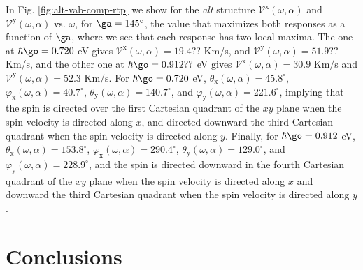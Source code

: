 \documentclass[prb,11pt,tightenlines,twocolumn,aps]{revtex4-1}
\begin{document}

% 


In Fig. \ref{fig:alt-vab-comp-rtp} 
we show  for the {\it alt} structure
$\mathcal{V}^{\mathrm{x}} (\omega,\alpha)$ 
and
$\mathcal{V}^{\mathrm{y}} (\omega,\alpha)$ 
vs. $\omega$, for $\ga=145^\circ$, the value that maximizes both
responses as a function of $\ga$, where we see that each response has
two local maxima. The one at $\hbar\go=0.720$ eV gives
$\mathcal{V}^{\mathrm{x}} (\omega,\alpha) =19.4??$ Km/s,
and $\mathcal{V}^{\mathrm{y}} (\omega,\alpha) = 51.9??$ Km/s, and the
other one at $\hbar\go=0.912??$ eV gives
$\mathcal{V}^{\mathrm{x}} (\omega,\alpha) = 30.9$ Km/s and
$\mathcal{V}^{\mathrm{y}} (\omega,\alpha) = 52.3$ Km/s.
% 
For $\hbar\go=0.720$ eV,
$\theta_{\mathrm{x}} (\omega,\alpha) = 45.8^{\circ}$, $\varphi_{\mathrm{x}}
(\omega,\alpha) = 40.7^{\circ}$, 
$\theta_{\mathrm{y}} (\omega,\alpha) =
140.7^{\circ}$, and $\varphi_{\mathrm{y}} (\omega,\alpha) =
221.6^{\circ}$, implying
% 
that the spin is directed over the first Cartesian quadrant of the $xy$ plane
when the spin velocity is directed along $x$, and directed downward the third
Cartesian quadrant when the spin velocity is directed along $y$. Finally, for
$\hbar\go=0.912$ eV, $\theta_{\mathrm{x}}(\omega,\alpha) = 153.8^{\circ}$,
$\varphi_{\mathrm{x}} (\omega,\alpha) = 290.4^{\circ}$, $\theta_{\mathrm{y}}
(\omega,\alpha) = 129.0^{\circ}$, and $\varphi_{\mathrm{y}} (\omega,\alpha)
=228.9^{\circ}$, and the spin is directed downward in the fourth Cartesian
quadrant of the $xy$ plane when the spin velocity is directed along $x$ and
downward the third Cartesian quadrant when the spin velocity is directed along
$y$.

\section{Conclusions} %
\label{sec:conclusions}
\end{document}
